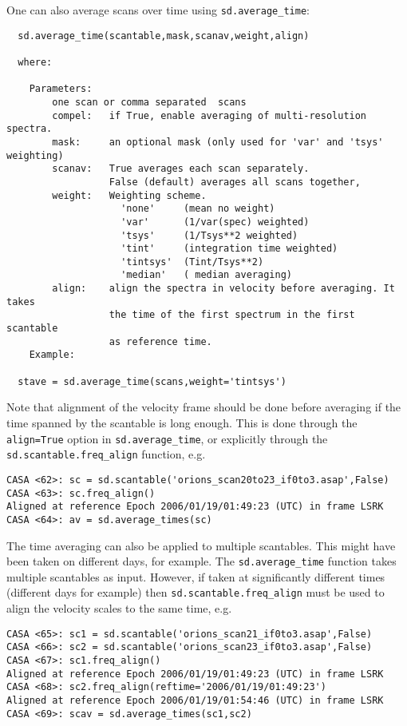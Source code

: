 One can also average scans over time using {\tt sd.average\_time}:
\small
\begin{verbatim}
  sd.average_time(scantable,mask,scanav,weight,align)

  where:

    Parameters:
        one scan or comma separated  scans
        compel:   if True, enable averaging of multi-resolution spectra.
        mask:     an optional mask (only used for 'var' and 'tsys' weighting)
        scanav:   True averages each scan separately.
                  False (default) averages all scans together,
        weight:   Weighting scheme.
                    'none'     (mean no weight)
                    'var'      (1/var(spec) weighted)
                    'tsys'     (1/Tsys**2 weighted)
                    'tint'     (integration time weighted)
                    'tintsys'  (Tint/Tsys**2)
                    'median'   ( median averaging)
        align:    align the spectra in velocity before averaging. It takes
                  the time of the first spectrum in the first scantable
                  as reference time.
    Example:
  
  stave = sd.average_time(scans,weight='tintsys')
\end{verbatim}
\normalsize

Note that alignment of the velocity frame should be done before
averaging if the time spanned by the scantable is 
long enough.  This is done through the {\tt align=True} option in
{\tt sd.average\_time}, or explicitly through the
{\tt sd.scantable.freq\_align} function, e.g.
\small
\begin{verbatim}
CASA <62>: sc = sd.scantable('orions_scan20to23_if0to3.asap',False)
CASA <63>: sc.freq_align()
Aligned at reference Epoch 2006/01/19/01:49:23 (UTC) in frame LSRK
CASA <64>: av = sd.average_times(sc)
\end{verbatim}
\normalsize

The time averaging can also be applied to multiple scantables.  This
might have been taken on different days, for example.  The
{\tt sd.average\_time} function takes multiple scantables as input.
However, if taken at significantly different times (different days for
example) then {\tt sd.scantable.freq\_align} must be used to align
the velocity scales to the same time, e.g.
\small
\begin{verbatim}
CASA <65>: sc1 = sd.scantable('orions_scan21_if0to3.asap',False)
CASA <66>: sc2 = sd.scantable('orions_scan23_if0to3.asap',False)
CASA <67>: sc1.freq_align()
Aligned at reference Epoch 2006/01/19/01:49:23 (UTC) in frame LSRK
CASA <68>: sc2.freq_align(reftime='2006/01/19/01:49:23')
Aligned at reference Epoch 2006/01/19/01:54:46 (UTC) in frame LSRK
CASA <69>: scav = sd.average_times(sc1,sc2)
\end{verbatim}
\normalsize

